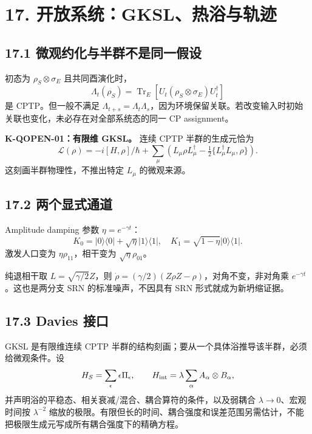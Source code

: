 \documentclass[
  11pt,
  oneside]{book}
\begin{document}
\hypertarget{ch-17}{%
\chapter{17. 开放系统：GKSL、热浴与轨迹}\label{ch-17}}

\hypertarget{ux5faeux89c2ux7ea6ux5316ux4e0eux534aux7fa4ux4e0dux662fux540cux4e00ux5047ux8bbe}{%
\section{17.1
微观约化与半群不是同一假设}\label{ux5faeux89c2ux7ea6ux5316ux4e0eux534aux7fa4ux4e0dux662fux540cux4e00ux5047ux8bbe}}

初态为 \(\rho_S\otimes\sigma_E\) 且共同酉演化时， \[
\Lambda_t(\rho_S)=\operatorname{Tr}_E[
U_t(\rho_S\otimes\sigma_E)U_t^\dagger]
\] 是 CPTP。但一般不满足
\(\Lambda_{t+s}=\Lambda_t\Lambda_s\)，因为环境保留关联。若改变输入时初始关联也变化，未必存在对全部系统态的同一
CP assignment。

\textbf{K-QOPEN-01：有限维 GKSL。} 连续 CPTP 半群的生成元恰为 \[
\mathcal L(\rho)=-i[H,\rho]/\hbar+
\sum_\mu\left(L_\mu\rho L_\mu^\dagger-
\tfrac12\{L_\mu^\dagger L_\mu,\rho\}\right).
\] 这刻画半群物理性，不推出特定 \(L_\mu\) 的微观来源。

\hypertarget{ux4e24ux4e2aux663eux5f0fux901aux9053}{%
\section{17.2 两个显式通道}\label{ux4e24ux4e2aux663eux5f0fux901aux9053}}

Amplitude damping 参数 \(\eta=e^{-\gamma t}\)： \[
K_0=|0\rangle\langle0|+\sqrt\eta|1\rangle\langle1|,
\quad K_1=\sqrt{1-\eta}|0\rangle\langle1|.
\] 激发人口变为 \(\eta\rho_{11}\)，相干变为 \(\sqrt\eta\rho_{01}\)。

纯退相干取 \(L=\sqrt{\gamma/2}Z\)，则
\(\dot\rho=(\gamma/2)(Z\rho Z-\rho)\)，对角不变，非对角乘
\(e^{-\gamma t}\)。这也是两分支 SRN 的标准噪声，不因具有 SRN
形式就成为新坍缩证据。

\hypertarget{davies-ux63a5ux53e3}{%
\section{17.3 Davies 接口}\label{davies-ux63a5ux53e3}}

GKSL 是有限维连续 CPTP
半群的结构刻画；要从一个具体浴推导该半群，必须给微观条件。设 \[
H_S=\sum_\epsilon\epsilon\Pi_\epsilon,\qquad
H_{
\rm int}=\lambda\sum_\alpha A_\alpha\otimes B_\alpha,
\] 并声明浴的平稳态、相关衰减/混合、耦合算符的条件，以及弱耦合
\(\lambda\to0\)、宏观时间按 \(\lambda^{-2}\)
缩放的极限。有限但长的时间、耦合强度和误差范围另需估计，不能把极限生成元写成所有耦合强度下的精确方程。
\end{document}
